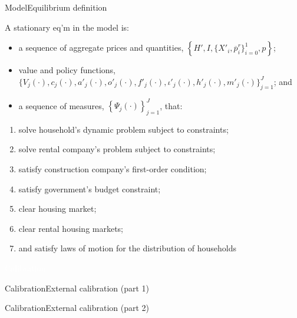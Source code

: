 \documentclass[11pt,aspectratio=169]{beamer}
\begin{document}
\begin{frame}{Model}{Equilibrium definition}

A stationary eq'm in the model is:

\begin{itemize}
    \item a sequence of aggregate prices and quantities, $\left\{H',I,\{X'_{i},\overline{p}^{r}_{i}\}^{1}_{i=0},p\right\}$;
    \item value and policy functions, $\biggl\{V_{j}(\cdot),c_{j}(\cdot),a'_{j}(\cdot),o'_{j}(\cdot),f'_{j}(\cdot),\iota'_{j}(\cdot),h'_{j}(\cdot),m'_{j}(\cdot)\biggl\}_{j=1}^J$; and
    \item a sequence of measures, $\left\{\Psi_{j}(\cdot)\right\}_{j=1}^J$, that:
\end{itemize}
\begin{enumerate}
\item solve household's dynamic problem subject to constraints;
\item solve rental company's problem subject to constraints;
\item satisfy construction company's first-order condition;
\item satisfy government's budget constraint;
\item clear housing market;
\item clear rental housing markets;
\item and satisfy laws of motion for the distribution of households
\end{enumerate}
    
\end{frame}

{
\begin{frame}{}

\centering \Large
\textcolor{white}{Calibration}
    
\end{frame}

}

\begin{frame}{Calibration}{External calibration (part 1)}



\end{frame}

\begin{frame}{Calibration}{External calibration (part 2)}



\end{frame}
\end{document}
